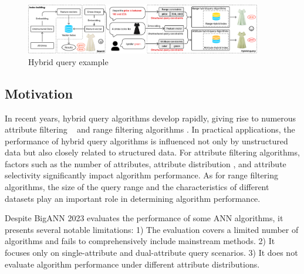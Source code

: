 \documentclass[sigconf, nonacm]{acmart}
\begin{document}
	\begin{figure}
		\centering
		
		\includegraphics[width=0.92\textwidth]{figures/hybrid ANNS.pdf}
		\caption{Hybrid query example}
		
		\label{fig:hybrid ANNS}
	\end{figure}
	\subsection{Motivation}
	
	In recent years, hybrid query algorithms develop rapidly, giving rise to numerous attribute filtering ~\cite{NHQ,diskann} and range filtering algorithms \cite{serf,iRangeGraph}. In practical applications, the performance of hybrid query algorithms is influenced not only by unstructured data but also closely related to structured data. For attribute filtering algorithms, factors such as the number of attributes, attribute distribution \cite{UNG}, and attribute selectivity \cite{ACORN} significantly impact algorithm performance. As for range filtering algorithms, the size of the query range and the characteristics of different datasets  play an important role in determining algorithm performance.
	
	Despite BigANN 2023 \cite{bigann2023} evaluates the performance of some ANN algorithms, it presents several notable limitations:
	1) The evaluation covers a limited number of algorithms and fails to comprehensively include mainstream methods. 
	2) It focuses only on single-attribute and dual-attribute query scenarios. 
	3) It does not evaluate algorithm performance under different attribute distributions. 
	
\end{document}
